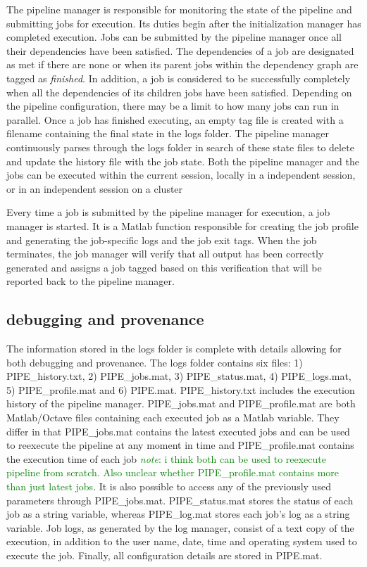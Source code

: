 \documentclass{report}
\newcommand{\note}[1]{\textcolor{green}{\textit{note}: #1}}
\begin{document}
        The pipeline manager is responsible for monitoring the state of the
pipeline and submitting jobs for execution. Its duties begin after the
initialization manager has completed execution. Jobs can be submitted by the
pipeline manager once all their dependencies have been satisfied. The
dependencies of a job are designated as met if there are none or when its parent jobs within the
dependency graph are tagged as \textit{finished}. In addition, a job is
considered to be successfully completely when all the dependencies of its
children jobs have been satisfied. Depending on the pipeline configuration,
there may be a limit to how many jobs can run in parallel. Once a job has
finished executing, an empty tag file is created with a filename containing the
final state in the logs folder. The pipeline manager continuously parses through
the logs folder in search of these state files to delete and update the history
file with the job state. Both the pipeline manager and the jobs can be executed
within the current session, locally in a independent session, or in an
independent session on a cluster

        
        Every time a job is submitted by the pipeline manager for execution, a
job manager is started. It is a Matlab function responsible for creating the job
profile and generating the job-specific logs and the job exit tags. When
the job terminates, the job manager will verify that all output has been
correctly generated and assigns a job tagged based on this verification that
will be reported back to the pipeline manager.

        \subsection{debugging and provenance}

        The information stored in the logs folder is complete with details
allowing for both debugging and provenance. The logs folder contains six files:
1) PIPE\_history.txt, 2) PIPE\_jobs.mat, 3) PIPE\_status.mat, 4) PIPE\_logs.mat,
5) PIPE\_profile.mat and 6) PIPE.mat. PIPE\_history.txt includes the execution
history of the pipeline manager. PIPE\_jobs.mat and PIPE\_profile.mat are both
Matlab/Octave files containing each executed job as a Matlab variable. They
differ in that PIPE\_jobs.mat contains the latest executed jobs and can be used
to reexecute the pipeline at any moment in time and PIPE\_profile.mat contains
the execution time of each job \note{i think both can be used to reexecute
pipeline from scratch. Also unclear whether PIPE\_profile.mat contains more than
just latest jobs}. It is also possible to access any of the previously 
used parameters through PIPE\_jobs.mat. PIPE\_status.mat stores the status of each 
job as a string variable, whereas PIPE\_log.mat stores each job's log as a string 
variable. Job logs, as generated by the log manager, consist of a text copy of the 
execution, in addition to the user name, date, time and operating system used to 
execute the job. Finally, all configuration details are stored in PIPE.mat. 
       
\end{document}
